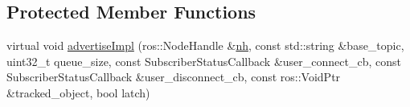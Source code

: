 \subsection*{Protected Member Functions}
\begin{DoxyCompactItemize}
\item 
\hypertarget{classimage__transport_1_1_simple_publisher_plugin_af9ca774ef9d18a9cf745c92762c00d91}{virtual void \hyperlink{classimage__transport_1_1_simple_publisher_plugin_af9ca774ef9d18a9cf745c92762c00d91}{advertise\-Impl} (ros\-::\-Node\-Handle \&\hyperlink{classimage__transport_1_1_simple_publisher_plugin_a5f73a993e871242e51671f3cf82d4e1b}{nh}, const std\-::string \&base\-\_\-topic, uint32\-\_\-t queue\-\_\-size, const Subscriber\-Status\-Callback \&user\-\_\-connect\-\_\-cb, const Subscriber\-Status\-Callback \&user\-\_\-disconnect\-\_\-cb, const ros\-::\-Void\-Ptr \&tracked\-\_\-object, bool latch)}\label{classimage__transport_1_1_simple_publisher_plugin_af9ca774ef9d18a9cf745c92762c00d91}


\end{DoxyCompactItemize}
